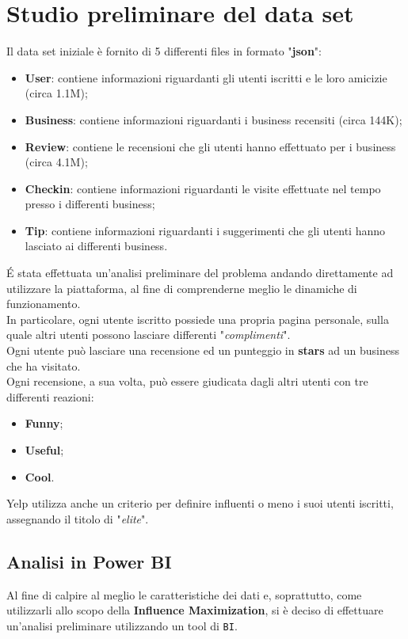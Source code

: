 
\chapter{Studio preliminare del data set}
Il data set iniziale è fornito di 5 differenti files in formato "\textbf{json}":
\begin{itemize}
	\item \textbf{User}: contiene informazioni riguardanti gli utenti iscritti e le loro amicizie (circa 1.1M);
	\item \textbf{Business}: contiene informazioni riguardanti i business recensiti (circa 144K);
	\item \textbf{Review}: contiene le recensioni che gli utenti hanno effettuato per i business (circa 4.1M);
	\item \textbf{Checkin}: contiene informazioni riguardanti le visite effettuate nel tempo presso i differenti business;
	\item \textbf{Tip}: contiene informazioni riguardanti i suggerimenti che gli utenti hanno lasciato ai differenti business.
\end{itemize}

\'E stata effettuata un'analisi preliminare del problema andando direttamente ad
utilizzare la piattaforma, al fine di comprenderne meglio le dinamiche di
funzionamento.\\
In particolare, ogni utente iscritto possiede una propria
pagina personale, sulla quale altri utenti possono lasciare differenti
"\textit{complimenti}".\\
Ogni utente può lasciare una recensione ed un punteggio in
\textbf{stars} ad un business che ha visitato.\\
Ogni recensione, a sua volta, può essere giudicata dagli altri utenti con tre
differenti reazioni:
\begin{itemize}
	\item \textbf{Funny};
	\item \textbf{Useful};
	\item \textbf{Cool}.
\end{itemize}
Yelp utilizza anche un criterio per definire influenti o meno i suoi utenti iscritti,
assegnando il titolo di "\textit{elite}".\\

\section{Analisi in Power BI}
Al fine di calpire al meglio le caratteristiche dei dati e, soprattutto, come
utilizzarli allo scopo della \textbf{Influence Maximization}, si è deciso di
effettuare un'analisi preliminare utilizzando un tool di \texttt{BI}.\\

